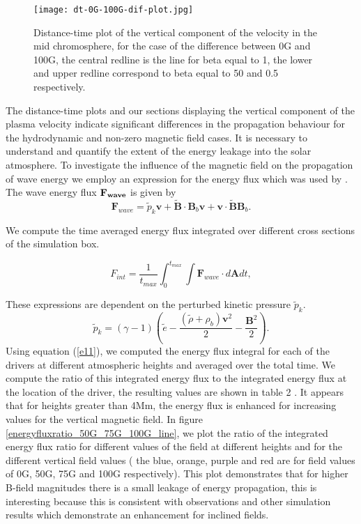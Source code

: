 \documentclass[linenumbers]{aastex63}
\begin{document}
\begin{figure}
\centering
\label{td_vert_dif_bv0G_100G_300}
\texttt{[image: dt-0G-100G-dif-plot.jpg]}
\caption{Distance-time plot of the vertical component of the velocity in the mid chromosphere, for the case of the difference between 0G and 100G, the central redline is the line for beta  equal to 1, the lower and upper redline correspond to beta equal to 50 and 0.5 respectively.}
\end{figure}

The distance-time plots and our sections displaying the vertical component of the plasma velocity indicate significant differences in the propagation behaviour for the hydrodynamic and non-zero magnetic field cases. It is necessary to understand and quantify the extent of the energy leakage into the solar atmosphere. To investigate the influence of the magnetic field on the propagation of wave energy we employ an expression for the energy flux which was used by \citet{Bogdan2003}. The wave energy flux $\bf{F}_{wave}$ is given by
$$
{\mathbf F}_{wave}=\tilde{p}_{k} {\mathbf v}+\tilde{\mathbf B}\cdot {\mathbf B_{b}}{\mathbf v}+{\mathbf v}\cdot \tilde{\mathbf B}{\mathbf B_{b}} .
$$

We compute the time averaged energy flux integrated over different cross sections of the simulation box.

\begin{equation}
F_{int}= \frac{1}{t_{max}} \int_{0}^{t_{max}} \int {\mathbf F}_{wave} \cdot d{\mathbf A}dt,
\label{e11}
\end{equation}

These expressions are dependent on the perturbed kinetic pressure $\tilde{p}_{k}$.
$$
\tilde{p}_{k}=\left(\gamma - 1\right)\left( \tilde{e}-\frac{ \left( \tilde{\rho} +\rho_b \right){\mathbf v}^2}{2}-\frac{{\mathbf B}^2}{2}\right).
$$
Using equation (\ref{e11}), we computed the energy flux integral for each of the drivers at different atmospheric heights and averaged over the total time. We compute the ratio of this integrated energy flux to the integrated energy flux at the location of the driver, the resulting values are shown in table 2 . It appears that for heights greater than 4Mm, the energy flux is enhanced for increasing values for the vertical magnetic field. In figure \ref{energyfluxratio_50G_75G_100G_line},  we plot the ratio of the integrated energy flux ratio for different values of the field at different heights and for the different vertical field values ( the blue, orange, purple and red  are for field values of 0G, 50G, 75G and 100G respectively). This plot demonstrates that for higher B-field magnitudes there is a small leakage of energy propagation, this is interesting because this is consistent with observations and other simulation results which demonstrate an enhancement for inclined fields.
\end{document}
